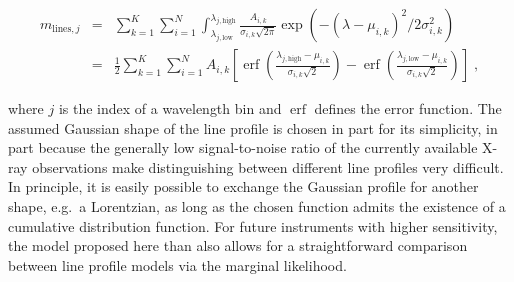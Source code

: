 \documentclass[12pt]{emulateapj}
\DeclareMathOperator\erf{erf}
\newcommand{\mean}{m}
\begin{document}
\begin{eqnarray}
\mean_{\mathrm{lines},j} & = &  \sum_{k=1}^{K}\sum_{i=1}^{N}{\int^{ \lambda_{j,\mathrm{high}}}_{\lambda_{j, \mathrm{low}}}{\frac{A_{i,k}}{\sigma_{i,k}\sqrt{2\pi}} \exp{(-(\lambda-\mu_{i,k})^2/{2\sigma_{i,k}^2})}}} \\ \nonumber
& = & \frac{1}{2}  \sum_{k=1}^{K} \sum_{i=1}^{N} A_{i,k}   \left[ \erf{\left( \frac{\lambda_{j,\mathrm{high}} - \mu_{i,k}}{\sigma_{i,k}\sqrt{2}}\right)} - \erf{\left( \frac{\lambda_{j, \mathrm{low}} - \mu_{i,k}}{\sigma_{i,k}\sqrt{2}}\right)} \right] \; ,
\end{eqnarray}

\noindent where $j$ is the index of a wavelength bin and $\erf$ defines the error function. The assumed Gaussian shape of the line profile is chosen in part for its simplicity, in part because the generally low signal-to-noise ratio of the currently available X-ray observations make distinguishing between different line profiles very difficult. In principle, it is easily possible to exchange the Gaussian profile for another shape, e.g.\ a Lorentzian, as long as the chosen function admits the existence of a cumulative distribution function. For future instruments with higher sensitivity, the model proposed here than also allows for a straightforward comparison between line profile models via the marginal likelihood. 
\end{document}
